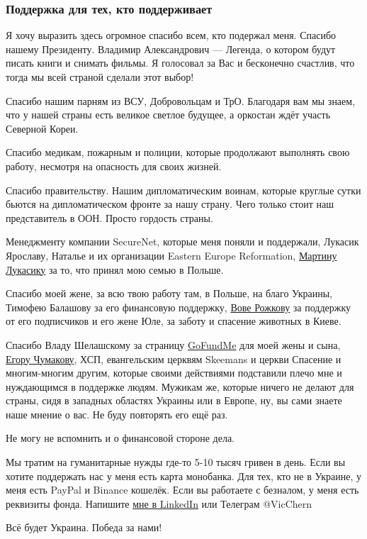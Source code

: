  
 
 
 
 

\subsubsection{Поддержка для тех, кто поддерживает}

Я хочу выразить здесь огромное спасибо всем, кто подержал меня. Спасибо нашему
Президенту. Владимир Александрович — Легенда, о котором будут писать книги и
снимать фильмы. Я голосовал за Вас и бесконечно счастлив, что тогда мы всей
страной сделали этот выбор!

Спасибо нашим парням из ВСУ, Добровольцам и ТрО. Благодаря вам мы знаем, что у
нашей страны есть великое светлое будущее, а оркостан ждёт участь Северной
Кореи.

Спасибо медикам, пожарным и полиции, которые продолжают выполнять свою работу,
несмотря на опасность для своих жизней.

Спасибо правительству. Нашим дипломатическим воинам, которые круглые сутки
бьются на дипломатическом фронте за нашу страну. Чего только стоит наш
представитель в ООН. Просто гордость страны.

Менеджменту компании SecureNet, которые меня поняли и поддержали, Лукасик
Ярославу, Наталье и их организации Eastern Europe Reformation, \href{https://www.linkedin.com/in/mlukasik-dev/}{Мартину Лукасику}
за то, что принял мою семью в Польше.

Спасибо моей жене, за всю твою работу там, в Польше, на благо Украины, Тимофею
Балашову за его финансовую поддержку,
\href{https://www.linkedin.com/in/rozhok/}{Вове Рожкову} за поддержку от его
подписчиков и его жене Юле, за заботу и спасение животных в Киеве.

Спасибо Владу Шелашскому за страницу
\href{https://gofund.me/d1b741ea}{GoFundMe} для моей жены и сына,
\href{https://www.linkedin.com/in/yegor-chumakov-8a9304125/}{Егору Чумакову},
ХСП, евангельским церквям Skeemans и церкви Спасение и многим-многим другим,
которые своими действиями подставили плечо мне и нуждающимся в поддержке людям.
Мужикам же, которые ничего не делают для страны, сидя в западных областях
Украины или в Европе, ну, вы сами знаете наше мнение о вас.  Не буду повторять
его ещё раз.

Не могу не вспомнить и о финансовой стороне дела.

Мы тратим на гуманитарные нужды где-то 5-10 тысяч гривен в день. Если вы хотите
поддержать нас у меня есть карта монобанка. Для тех, кто не в Украине, у меня
есть PayPal и Binance кошелёк. Если вы работаете с безналом, у меня есть
реквизиты фонда. Напишите \href{https://www.linkedin.com/in/vicchern/}{мне в
LinkedIn} или Телеграм @VicChern

Всё будет Украина. Победа за нами!
